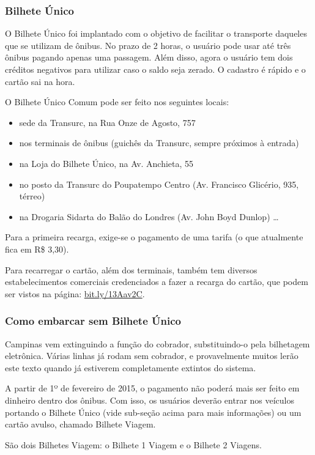 \subsubsection*{Bilhete Único}

O Bilhete Único foi implantado com o objetivo de facilitar o transporte daqueles
que se utilizam de ônibus. No prazo de 2 horas, o usuário pode usar até três
ônibus pagando apenas uma passagem. Além disso, agora o usuário tem dois
créditos negativos para utilizar caso o saldo seja zerado. O cadastro é rápido e
o cartão sai na hora.

O Bilhete Único Comum pode ser feito nos seguintes locais:
\begin{itemize}
  \item sede da Transurc, na Rua Onze de Agosto, 757
  \item nos terminais de ônibus (guichês da Transurc, sempre próximos à entrada)
  \item na Loja do Bilhete Único, na Av. Anchieta, 55
  \item no posto da Transurc do Poupatempo Centro (Av. Francisco Glicério, 935,
térreo)
  \item na Drogaria Sidarta do Balão do Londres (Av. John Boyd Dunlop) \ldots
\end{itemize}

Para a primeira recarga, exige-se o pagamento de uma tarifa (o que atualmente
fica em R\$ 3,30).

Para recarregar o cartão, além dos terminais, também tem diversos
estabelecimentos comerciais credenciados a fazer a recarga do cartão, que podem
ser vistos na página:
\url{bit.ly/13Aav2C}.

\subsubsection*{Como embarcar sem Bilhete Único}

Campinas vem extinguindo a função do cobrador, substituindo-o pela bilhetagem
eletrônica. Várias linhas já rodam sem cobrador, e provavelmente muitos lerão
este texto quando já estiverem completamente extintos do sistema.

A partir de 1º de fevereiro de 2015, o pagamento não poderá mais ser feito em
dinheiro dentro dos ônibus. Com isso, os usuários deverão entrar nos veículos
portando o Bilhete Único (vide sub-seção acima para mais informações) ou um
cartão avulso, chamado Bilhete Viagem.

São dois Bilhetes Viagem: o Bilhete 1 Viagem e o Bilhete 2 Viagens.

